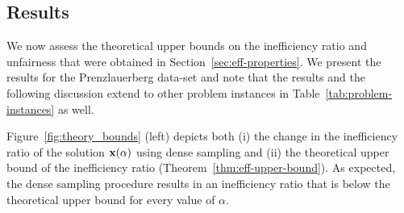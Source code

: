 \documentclass{article}
\newif\ifarxiv   %
\begin{document}
\subsection{Results} \label{sec:numerical-results}


\ifarxiv
We first assess the theoretical upper bounds on the inefficiency ratio and level of unfairness that were obtained in Section~\ref{sec:eff-properties} with respect to the convex combination parameter~$\alpha$. The latter is obtained using a dense sampling method with increments of $0.01$. We present the results for the Prenzlauerberg data-set and note that the results and the following discussion extend to other problem instances in Table~\ref{tab:problem-instances} as well.
\else 
We now assess the theoretical upper bounds on the inefficiency ratio and unfairness that were obtained in Section~\ref{sec:eff-properties}. We present the results for the Prenzlauerberg data-set and note that the results and the following discussion extend to other problem instances in Table~\ref{tab:problem-instances} as well.
\fi


\ifarxiv
Figure~\ref{fig:theory_bounds} (left) depicts both (i) the change in the inefficiency ratio of the solution $\mathbf{x}(\alpha)$ using dense sampling
and (ii) the theoretical upper bound of the inefficiency ratio (Theorem~\ref{thm:eff-upper-bound}). As expected, the dense sampling procedure results in an inefficiency ratio that is below the theoretical upper bound for every value of $\alpha$.  %
\end{document}
